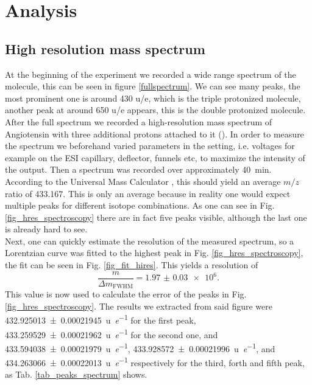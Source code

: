 \documentclass[a4paper,10pt]{article}
\begin{document}
\section{Analysis}

\subsection{High resolution mass spectrum}
At the beginning of the experiment we recorded a wide range spectrum of the molecule, this can be seen in figure \ref{fullspectrum}. We can see many peaks, the most prominent one is around 430 u/e, which is the triple protonized molecule, another peak at around 650 u/e appears, this is the double protonized molecule. After the full spectrum we recorded a high-resolution mass spectrum of Angiotensin with three additional protons attached to it (). In order to measure the spectrum we beforehand varied parameters in the setting, i.e. voltages for example on the ESI capillary, deflector, funnels etc, to maximize the intensity of the output.
Then a spectrum was recorded over approximately \SI{40}{\minute}.\\
According to the Universal Mass Calculator \cite{umc}, this should yield an average $m/z$ ratio of \num{433.167}. This is only an average because in reality one would expect multiple peaks for different isotope combinations. As one can see in Fig. \ref{fig_hres_spectroscopy} there are in fact five peaks visible, although the last one is already hard to see. \\
Next, one can quickly estimate the resolution of the measured spectrum, so a Lorentzian curve was fitted to the highest peak in Fig. \ref{fig_hres_spectroscopy}, the fit can be seen in Fig. \ref{fig_fit_hires}. This yields a resolution of
\begin{equation}
	\frac{m}{\Delta m_\mathrm{FWHM}} = \num{1.97(3) e6}.
\end{equation}
This value is now used to calculate the error of the peaks in Fig. \ref{fig_hres_spectroscopy}. The results we extracted from said figure were \SI{432.925013 \pm 0.00021945}{\atomicmassunit \per \elementarycharge} for the first peak, \SI{433.259529 \pm 0.00021962}{\atomicmassunit \per \elementarycharge} for the second one, and \SI{433.594038 \pm 0.00021979}{\atomicmassunit \per \elementarycharge}, \SI{433.928572 \pm 0.00021996}{\atomicmassunit \per \elementarycharge}, and \SI{434.263066 \pm 0.00022013}{\atomicmassunit \per \elementarycharge} respectively for the third, forth and fifth peak, as Tab. \ref{tab_peaks_spectrum} shows.
\end{document}
